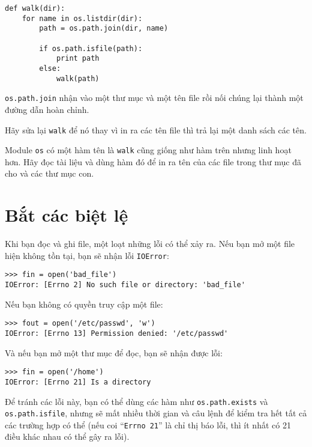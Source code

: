 \documentclass[11pt]{book}
\begin{document}

\beforeverb
\begin{verbatim}
def walk(dir):
    for name in os.listdir(dir):
        path = os.path.join(dir, name)

        if os.path.isfile(path):
            print path
        else:
            walk(path)
\end{verbatim}
\afterverb
%
{\tt os.path.join} nhận vào một thư mục và một tên file
rồi nối chúng lại thành một đường dẫn hoàn chỉnh.

\begin{ex}
Hãy sửa lại {\tt walk} để nó thay vì in ra các tên file thì trả lại
một danh sách các tên.
\end{ex}

\begin{ex}
Module {\tt os} có một hàm tên là {\tt walk} cũng giống như
hàm trên nhưng linh hoạt hơn. Hãy đọc tài liệu và dùng hàm đó
để in ra tên của các file trong thư mục đã cho và các thư mục con.
\end{ex}


\section{Bắt các biệt lệ}
\label{catch}

Khi bạn đọc và ghi file, một loạt những lỗi có thể xảy ra. Nếu
bạn mở một file hiện không tồn tại, bạn sẽ nhận lỗi 
{\tt IOError}:


\beforeverb
\begin{verbatim}
>>> fin = open('bad_file')
IOError: [Errno 2] No such file or directory: 'bad_file'
\end{verbatim}
\afterverb
%
Nếu bạn không có quyền truy cập một file:


\beforeverb
\begin{verbatim}
>>> fout = open('/etc/passwd', 'w')
IOError: [Errno 13] Permission denied: '/etc/passwd'
\end{verbatim}
\afterverb
%
Và nếu bạn mở một thư mục để đọc, bạn sẽ nhận được lỗi:

\beforeverb
\begin{verbatim}
>>> fin = open('/home')
IOError: [Errno 21] Is a directory
\end{verbatim}
\afterverb
%
Để tránh các lỗi này, bạn có thể dùng các hàm như {\tt os.path.exists}
và {\tt os.path.isfile}, nhưng sẽ mất nhiều thời gian và câu lệnh để
kiểm tra hết tất cả các trường hợp có thể (nếu coi ``{\tt Errno 21}'' là 
chỉ thị báo lỗi, thì ít nhất có 21 điều khác nhau có thể gây ra lỗi).
\end{document}
